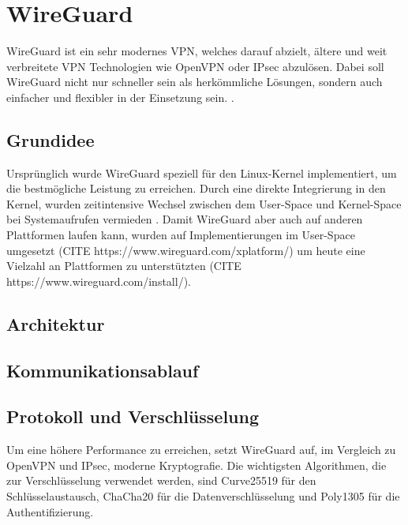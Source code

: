 \section{WireGuard}

WireGuard ist ein sehr modernes \gls{VPN}, welches darauf abzielt, ältere und weit verbreitete \gls{VPN} Technologien wie OpenVPN oder IPsec abzulösen. Dabei soll WireGuard nicht nur schneller sein als herkömmliche Lösungen, sondern auch einfacher und flexibler in der Einsetzung sein. \cite{Wireguard_Whitepaper}.

\subsection{Grundidee}

Ursprünglich wurde WireGuard speziell für den Linux-Kernel implementiert, um die bestmögliche Leistung zu erreichen. Durch eine direkte Integrierung in den Kernel, wurden zeitintensive Wechsel zwischen dem User-Space und Kernel-Space bei Systemaufrufen vermieden \cite{Wireguard_Whitepaper}. Damit WireGuard aber auch auf anderen Plattformen laufen kann, wurden auf Implementierungen im User-Space umgesetzt (CITE https://www.wireguard.com/xplatform/) um heute eine Vielzahl an Plattformen zu unterstützten (CITE https://www.wireguard.com/install/).

\subsection{Architektur}

\subsection{Kommunikationsablauf}

\subsection{Protokoll und Verschlüsselung}

Um eine höhere Performance zu erreichen, setzt WireGuard auf, im Vergleich zu OpenVPN und IPsec, moderne Kryptografie. Die wichtigsten Algorithmen, die zur Verschlüsselung verwendet werden, sind Curve25519 \cite{Wireguard_Curve25519} für den Schlüsselaustausch, ChaCha20 \cite{Wireguard_ChaCha20} für die Datenverschlüsselung und Poly1305 \cite{Wireguard_Poly1305} für die Authentifizierung.

